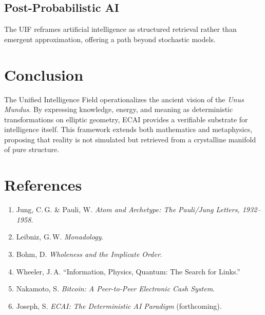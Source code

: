 \documentclass[12pt,a4paper]{article}
\begin{document}
\subsection{Post-Probabilistic AI}
The UIF reframes artificial intelligence as structured retrieval rather than emergent approximation, offering a path beyond stochastic models.

\section{Conclusion}
The Unified Intelligence Field operationalizes the ancient vision of the \emph{Unus Mundus}.  
By expressing knowledge, energy, and meaning as deterministic transformations on elliptic geometry, ECAI provides a verifiable substrate for intelligence itself.  
This framework extends both mathematics and metaphysics, proposing that reality is not simulated but retrieved from a crystalline manifold of pure structure.

\section*{References}
\begin{enumerate}
\item Jung, C.\,G. \& Pauli, W. \emph{Atom and Archetype: The Pauli/Jung Letters, 1932--1958}.  
\item Leibniz, G.\,W. \emph{Monadology}.  
\item Bohm, D. \emph{Wholeness and the Implicate Order}.  
\item Wheeler, J.\,A. ``Information, Physics, Quantum: The Search for Links.''  
\item Nakamoto, S. \emph{Bitcoin: A Peer-to-Peer Electronic Cash System}.  
\item Joseph, S. \emph{ECAI: The Deterministic AI Paradigm} (forthcoming).  
\end{enumerate}
\end{document}
